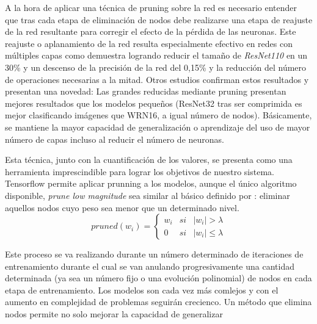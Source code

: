 A la hora de aplicar una técnica de pruning sobre la red es necesario entender que tras cada etapa de eliminación de nodos debe realizarse una etapa de reajuste de la red resultante para corregir el efecto de la pérdida de las neuronas. Este reajuste o aplanamiento de la red resulta especialmente efectivo en redes con múltiples capas como demuestra  logrando reducir el tamaño de \textit{ResNet110} en un 30\% y un descenso de la precisión de la red del 0,15\% y la reducción del número de operaciones necesarias a la mitad. Otros estudios\cite{Lee2019,Bartoldson2019,Han2015} confirman estos resultados y presentan una novedad: Las grandes reducidas mediante pruning presentan mejores resultados que los modelos pequeños (ResNet32 tras ser comprimida es mejor clasificando imágenes que WRN16, a igual número de nodos). Básicamente, se mantiene la mayor capacidad de generalización o aprendizaje del uso de mayor número de capas incluso al reducir el número de neuronas.

Esta técnica, junto con la cuantificación de los valores, se presenta como una herramienta imprescindible para lograr los objetivos de nuestro sistema. Tensorflow permite aplicar prunning a los modelos, aunque el único algoritmo disponible, \textit{prune low magnitude} sea similar al básico definido por : eliminar aquellos nodos cuyo peso sea menor que un determinado nivel.
\[
  pruned(w_{i})=\left\{
    \begin{array}{lcl}
      w_i & si & |w_i| > \lambda \\
      0 & si & |w_i|\leq  \lambda
    \end{array}
    \right.
\]

Este proceso se va realizando durante un número determinado de iteraciones de entrenamiento durante el cual se van anulando progresivamente una cantidad determinada (ya sea un número fijo o una evolución polinomial) de nodos en cada etapa de entrenamiento. \cite{Yann1989} Los modelos son cada vez más comlejos y con el aumento en complejidad de problemas seguirán crecienco. Un método que elimina nodos permite no solo mejorar la capacidad de generalizar 

\begin{comment}

  https://www.machinecurve.com/index.php/2020/09/23/tensorflow-model-optimization-an-introduction-to-pruning/
  ligeramente más técnico.
https://www.machinecurve.com/index.php/2020/09/29/tensorflow-pruning-schedules-constantsparsity-and-polynomialdecay/
\end{comment}


